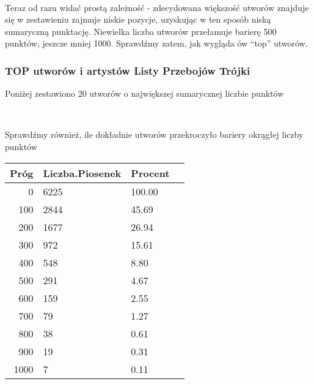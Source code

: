 \documentclass[11pt]{article}
\begin{document}
    \begin{center}
    \end{center}
    { \hspace*{\fill} \\}
    
    Teraz od razu widać prostą zależność - zdecydowana większość utworów
znajduje się w zestawieniu zajmuje niskie pozycje, uzyskując w ten
sposób niską sumaryczną punktację. Niewielka liczba utworów przełamuje
barierę 500 punktów, jeszcze mniej 1000. Sprawdźmy zatem, jak wygląda ów
``top'' utworów.

\hypertarget{top-utworuxf3w-i-artystuxf3w-listy-przebojuxf3w-truxf3jki}{%
\subsubsection{TOP utworów i artystów Listy Przebojów
Trójki}\label{top-utworuxf3w-i-artystuxf3w-listy-przebojuxf3w-truxf3jki}}

Poniżej zestawiono 20 utworów o największej sumarycznej liczbie punktów

    \begin{center}
    \end{center}
    { \hspace*{\fill} \\}
    
    Sprawdźmy również, ile dokładnie utworów przekroczyło bariery okrągłej
liczby punktów

    \begin{tabular}{r|lll}
 Próg & Liczba.Piosenek & Procent\\
\hline
	    0   & 6225   & 100.00\\
	  100   & 2844   &  45.69\\
	  200   & 1677   &  26.94\\
	  300   &  972   &  15.61\\
	  400   &  548   &   8.80\\
	  500   &  291   &   4.67\\
	  600   &  159   &   2.55\\
	  700   &   79   &   1.27\\
	  800   &   38   &   0.61\\
	  900   &   19   &   0.31\\
	 1000   &    7   &   0.11\\
\end{tabular}
\end{document}
